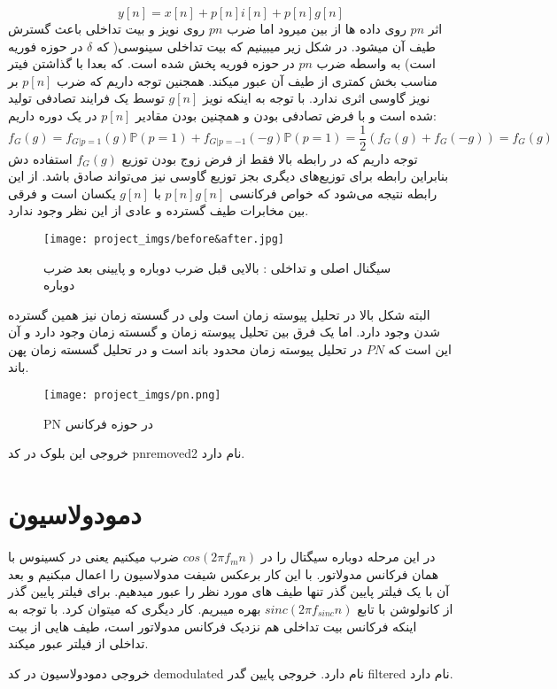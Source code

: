 \documentclass[11pt]{article}
\begin{document}
\begin{persian}
$$
y[n] = x[n] + p[n] i[n] + p[n]  g[n] 
$$
اثر $pn$ روی داده ها از بین میرود اما ضرب $pn$ روی نویز و بیت تداخلی باعث گسترش طیف آن میشود. در شکل زیر میبینیم که بیت تداخلی سینوسی( که $\delta$ در حوزه فوریه است) به واسطه ضرب $pn$ در حوزه فوریه پخش شده است. که بعدا با گذاشتن فیتر مناسب بخش کمتری از طیف آن عبور میکند. 
همجنین توجه داریم که ضرب $p[n]$ بر نویز گاوسی اثری ندارد. با توجه به اینکه نویز $g[n]$ توسط یک فرایند تصادفی تولید شده است و با فرض تصادفی بودن و همچنین  بودن مقادیر $p[n]$ در یک دوره داریم:
\begin{equation}
f_G(g)=f_{G|p=1}(g)\mathbb{P}(p=1)+f_{G|p=-1}(-g)\mathbb{P}(p=1)=\frac{1}{2}(f_G(g)+f_G(-g))=f_G(g)
\end{equation}
توجه داریم که در رابطه بالا فقط از فرض زوج بودن توزیع $f_G(g)$ استفاده دش بنابراین رابطه برای توزیع‌های دیگری بجز توزیع گاوسی نیز می‌تواند صادق باشد.
از این رابطه نتیجه می‌شود که خواص فرکانسی $p[n]g[n]$ با $g[n]$ یکسان است و فرقی بین مخابرات طیف گسترده و عادی از این نظر وجود ندارد.
\begin{figure}[H]
\centerline{\texttt{[image: project\_imgs/before\&after.jpg]}}
\caption{سیگنال اصلی و تداخلی : بالایی قبل ضرب دوباره و پایینی بعد ضرب دوباره}
\end{figure}

البته شکل بالا در تحلیل پیوسته زمان است ولی در گسسته زمان نیز همین گسترده شدن وجود دارد. اما یک فرق بین تحلیل پیوسته زمان و گسسته زمان وجود دارد و آن این است که $PN$ در تحلیل پیوسته زمان محدود باند است و در تحلیل گسسته زمان پهن باند. 

\begin{figure}[H]
\centerline{\texttt{[image: project\_imgs/pn.png]}}
\caption{PN در حوزه فرکانس}
\end{figure}

خروجی این بلوک در کد pnremoved2 نام دارد.
\section{دمودولاسیون}
در این مرحله دوباره سیگتال را در $cos(2\pi f_m n)$ ضرب میکنیم یعنی در کسینوس با همان فرکانس مدولاتور. با این کار برعکس شیفت مدولاسیون را اعمال مبکنیم و بعد آن با یک فیلتر پایین گذر تنها طیف های مورد نظر را عبور میدهیم. برای فیلتر پایین گذر از کانولوشن با تابع $sinc(2\pi f_{sinc}n)$ بهره میبریم. کار دیگری که میتوان کرد. با توجه به اینکه فرکانس بیت تداخلی هم نزدیک فرکانس مدولاتور است، طیف هایی از بیت تداخلی از فیلتر عبور میکند.

خروجی دمودولاسیون در کد demodulated نام دارد. خروجی پایین گدر filtered  نام دارد.

\end{persian}
\end{document}
